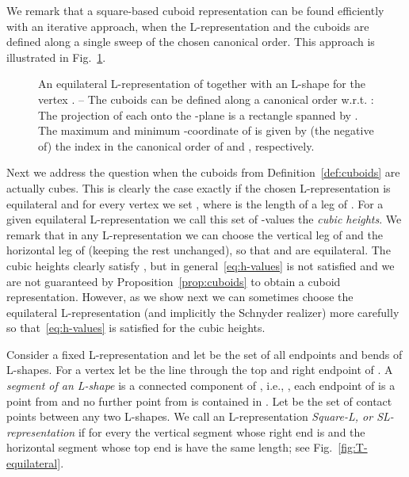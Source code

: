 \documentclass{llncs}
\begin{document}
We remark that a square-based cuboid representation can be found efficiently with an iterative approach, when the L-representation and the cuboids are defined along a single sweep of the chosen canonical order. This approach is illustrated in Fig.~\ref{fig:cuboids}.

\begin{figure}[t!]
\centering
 \caption{ An equilateral L-representation of  together with an L-shape for the vertex . -- The cuboids can be defined along a canonical order w.r.t. : The projection of each  onto the -plane is a rectangle spanned by . The maximum and minimum -coordinate of  is given by (the negative of) the index in the canonical order of  and , respectively.}
 \label{fig:cuboids}
\end{figure}

Next we address the question when the cuboids from Definition~\ref{def:cuboids} are actually cubes. This is clearly the case exactly if the chosen L-representation is equilateral and for every vertex  we set , where  is the length of a leg of . For a given equilateral L-representation we call this set of -values the \emph{cubic heights}. We remark that in any L-representation we can choose the vertical leg of  and the horizontal leg of  (keeping the rest unchanged), so that  and  are equilateral. The cubic heights clearly satisfy , but in general~\eqref{eq:h-values} is not satisfied and we are not guaranteed by Proposition~\ref{prop:cuboids} to obtain a cuboid representation. However, as we show next we can sometimes choose the equilateral L-representation (and implicitly the Schnyder realizer) more carefully so that~\eqref{eq:h-values} is satisfied for the cubic heights.

Consider a fixed L-representation and let  be the set of all endpoints and bends of L-shapes. 
For a vertex  let  be the line through the top and right endpoint of . A \emph{segment  of an L-shape } is a connected component of , i.e., , each endpoint of  is a point from  and no further point from  is contained in . Let  be the set of contact points between any two L-shapes. We call an L-representation \emph{Square-L, or SL-representation} if for every  the vertical segment whose right end is  and the horizontal segment whose top end is  have the same length; see Fig.~\ref{fig:T-equilateral}.
\end{document}
